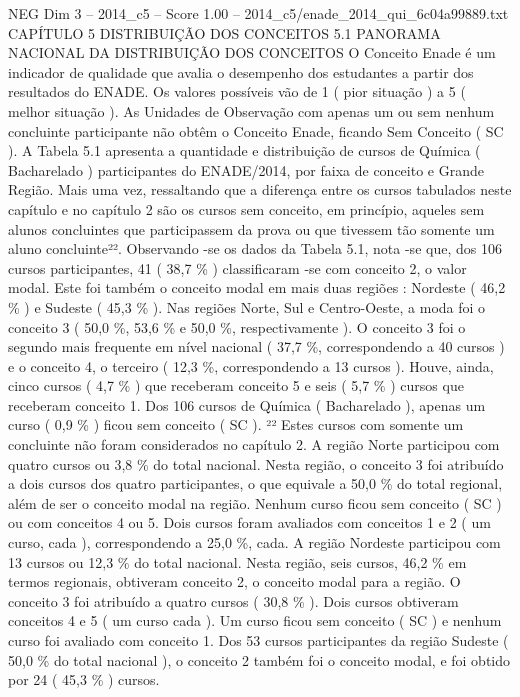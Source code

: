 \begin{textsample}{NEG Dim 3 – 2014\_c5 – Score 1.00 – 2014\_c5/enade\_2014\_qui\_6c04a99889.txt}  \label{ex:f3_neg_066}
CAPÍTULO 5 DISTRIBUIÇÃO DOS CONCEITOS 5.1 PANORAMA NACIONAL DA DISTRIBUIÇÃO DOS CONCEITOS O Conceito Enade é um indicador de qualidade que avalia o desempenho dos estudantes a partir dos resultados do ENADE.
Os valores possíveis vão de 1 ( pior situação ) a 5 ( melhor situação ).
As Unidades de Observação com apenas um ou sem nenhum concluinte participante não obtêm o Conceito Enade, ficando Sem Conceito ( SC ).
A Tabela 5.1 apresenta a quantidade e distribuição de cursos de Química ( Bacharelado ) participantes do ENADE/2014, por faixa de conceito e Grande Região.
Mais uma vez, ressaltando que a diferença entre os cursos tabulados neste capítulo e no capítulo 2 são os cursos sem conceito, em princípio, aqueles sem alunos concluintes que participassem da prova ou que tivessem tão somente um aluno concluinte²².
Observando -se os dados da Tabela 5.1, nota -se que, dos 106 cursos participantes, 41 ( 38,7 \% ) classificaram -se com conceito 2, o valor modal.
Este foi também o conceito modal em mais duas regiões : Nordeste ( 46,2 \% ) e Sudeste ( 45,3 \% ).
Nas regiões Norte, Sul e Centro-Oeste, a moda foi o conceito 3 ( 50,0 \%, 53,6 \% e 50,0 \%, respectivamente ).
O conceito 3 foi o segundo mais frequente em nível nacional ( 37,7 \%, correspondendo a 40 cursos ) e o conceito 4, o terceiro ( 12,3 \%, correspondendo a 13 cursos ).
Houve, ainda, cinco cursos ( 4,7 \% ) que receberam conceito 5 e seis ( 5,7 \% ) cursos que receberam conceito 1.
Dos 106 cursos de Química ( Bacharelado ), apenas um curso ( 0,9 \% ) ficou sem conceito ( SC ). ²² Estes cursos com somente um concluinte não foram considerados no capítulo 2.
A região Norte participou com quatro cursos ou 3,8 \% do total nacional.
Nesta região, o conceito 3 foi atribuído a dois cursos dos quatro participantes, o que equivale a 50,0 \% do total regional, além de ser o conceito modal na região.
Nenhum curso ficou sem conceito ( SC ) ou com conceitos 4 ou 5.
Dois cursos foram avaliados com conceitos 1 e 2 ( um curso, cada ), correspondendo a 25,0 \%, cada.
A região Nordeste participou com 13 cursos ou 12,3 \% do total nacional.
Nesta região, seis cursos, 46,2 \% em termos regionais, obtiveram conceito 2, o conceito modal para a região.
O conceito 3 foi atribuído a quatro cursos ( 30,8 \% ).
Dois cursos obtiveram conceitos 4 e 5 ( um curso cada ).
Um curso ficou sem conceito ( SC ) e nenhum curso foi avaliado com conceito 1.
Dos 53 cursos participantes da região Sudeste ( 50,0 \% do total nacional ), o conceito 2 também foi o conceito modal, e foi obtido por 24 ( 45,3 \% ) cursos.

\end{textsample}
